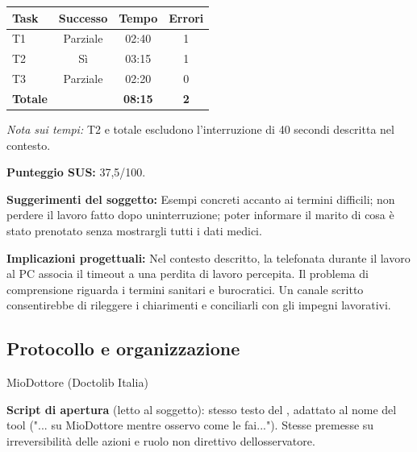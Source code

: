 \begin{center}
\begin{minipage}{\linewidth}
\centering
{}\label{tab:a-7}
\noindent\begin{tabular}{lccc}
\toprule
\textbf{Task} & \textbf{Successo} & \textbf{Tempo} & \textbf{Errori} \\
\midrule
T1 & Parziale & 02:40 & 1 \\
T2 & Sì & 03:15 & 1 \\
T3 & Parziale & 02:20 & 0 \\
\midrule
\textbf{Totale} & & \textbf{08:15} & \textbf{2} \\
\bottomrule
\end{tabular}
\end{minipage}
\end{center}

\noindent\textit{Nota sui tempi:} T2 e totale escludono l'interruzione di
40 secondi descritta nel contesto.

\textbf{Punteggio SUS:} 37,5/100.

\textbf{Suggerimenti del soggetto:} Esempi concreti accanto ai
termini difficili; non perdere il lavoro fatto dopo
un\textquotesingle interruzione; poter informare il marito di cosa è
stato prenotato senza mostrargli tutti i dati medici.

\textbf{Implicazioni progettuali:} Nel contesto descritto, la telefonata
durante il lavoro al PC associa il timeout a una perdita di lavoro percepita.
Il problema di comprensione riguarda i termini sanitari e burocratici.
Un canale scritto consentirebbe di rileggere i chiarimenti
e conciliarli con gli impegni lavorativi.

\label{doc:a:06b}

\subsection{Protocollo e organizzazione}


MioDottore (Doctolib Italia)


\textbf{Script di apertura} (letto al soggetto): stesso testo del
, adattato al nome del tool ("... su MioDottore mentre
osservo come le fai..."). Stesse premesse su irreversibilità delle
azioni e ruolo non direttivo dell\textquotesingle osservatore.

